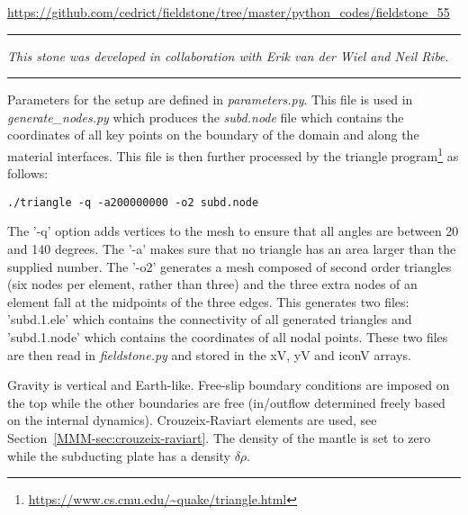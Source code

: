 

\begin{center}
\url{https://github.com/cedrict/fieldstone/tree/master/python_codes/fieldstone_55}
\end{center}

\par\noindent\rule{\textwidth}{0.4pt}

{\sl This stone was developed in collaboration with Erik van der Wiel and Neil Ribe}. 

\par\noindent\rule{\textwidth}{0.4pt}



\vspace{1cm}

Parameters for the setup are defined in {\sl parameters.py}.
This file is used in {\sl generate\_nodes.py} which produces the
{\sl subd.node} file which contains the coordinates of all key points 
on the boundary of the domain and along the material interfaces.
This file is then further processed by the triangle 
program\footnote{\url{https://www.cs.cmu.edu/~quake/triangle.html}}
as follows:
\begin{verbatim}
./triangle -q -a200000000 -o2 subd.node
\end{verbatim}
The '-q' option adds vertices to the mesh to
ensure that all angles are between 20 and 140 degrees. 
The '-a' makes sure that no triangle has an area larger than 
the supplied number. The '-o2' generates a mesh composed 
of second order triangles (six nodes per element, rather than three) and the
three extra nodes of an element fall at the midpoints of the three edges.
This generates two files: 'subd.1.ele' which contains the connectivity 
of all generated triangles and 'subd.1.node' which contains the coordinates
of all nodal points. 
These two files are then read in {\sl fieldstone.py} and stored in the xV, yV and iconV arrays.

Gravity is vertical and Earth-like. Free-slip boundary conditions are imposed on the top while 
the other boundaries are free (in/outflow determined freely based on the internal dynamics). 
Crouzeix-Raviart elements are used, see Section~\ref{MMM-sec:crouzeix-raviart}.
The density of the mantle is set to zero while the subducting plate has a density $\delta\rho$. 

